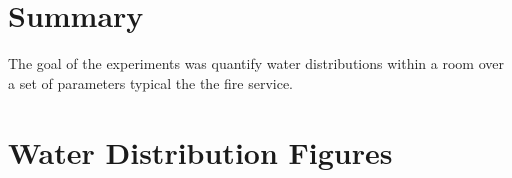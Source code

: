 \documentclass{book}
\begin{document}
\chapter{Summary}

The goal of the experiments was quantify water distributions within a room over a set of parameters typical the the fire service. 





\clearpage

\appendix



\chapter{Water Distribution Figures}
\label{app:Water_Distribution_Figures}
\end{document}
